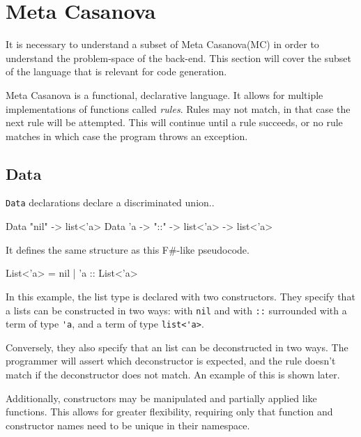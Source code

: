 \section{Meta Casanova}
It is necessary to understand a subset of Meta Casanova(MC) in order to understand the problem-space of the back-end.
This section will cover the subset of the language that is relevant for code generation.

Meta Casanova is a functional, declarative language.
It allows for multiple implementations of functions called \textit{rules}.
Rules may not match, in that case the next rule will be attempted.
This will continue until a rule succeeds, or no rule matches in which case the program throws an exception.

\subsection{Data}\label{mcdata}
\texttt{Data} declarations declare a discriminated union.\cite{algebraic_datastructures}.

\begin{MC}
Data "nil" -> list<'a>
Data 'a -> "::" -> list<'a> -> list<'a>
\end{MC}

It defines the same structure as this F\#-like pseudocode.

\begin{FS}
List<'a> = nil 
         | 'a :: List<'a>
\end{FS}

In this example, the list type is declared with two constructors.
They specify that a lists can be constructed in two ways: with \verb|nil| and with \verb|::| surrounded with a term of type \verb|'a|, and a term of type \verb|list<'a>|.

Conversely, they also specify that an list can be deconstructed in two ways.
The programmer will assert which deconstructor is expected, and the rule doesn't match if the deconstructor does not match.
An example of this is shown later.

Additionally, constructors may be manipulated and partially applied like functions.
This allows for greater flexibility, requiring only that function and constructor names need to be unique in their namespace.

%
%

